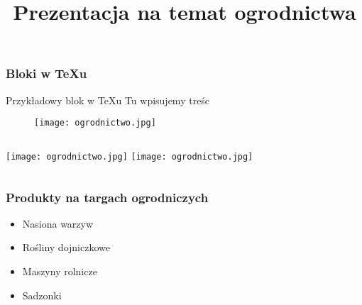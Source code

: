 \documentclass[]{beamer}
\title{Prezentacja na temat ogrodnictwa} \TeX a}
\date{}
\begin{document}
\frame
{
\frametitle{Bloki w \TeX u}
\begin{block}
{Przykładowy blok w \TeX u}
Tu wpisujemy treśc
\end{block}
}

\frame
{
\begin{figure}[here]
\begin{center}
\texttt{[image: ogrodnictwo.jpg]}
\end{center}
\end{figure}
}

\frame
{
\begin{columns}
\texttt{[image: ogrodnictwo.jpg]}
\texttt{[image: ogrodnictwo.jpg]}
\end{columns}
}

\frame
{
\begin{table}
\end{table}
}

\frame
{
\frametitle{Produkty na targach ogrodniczych}
\begin{itemize}
\item Nasiona warzyw
\item Rośliny dojniczkowe
\item Maszyny rolnicze
\item Sadzonki
\end{itemize}
}
\end{document}

